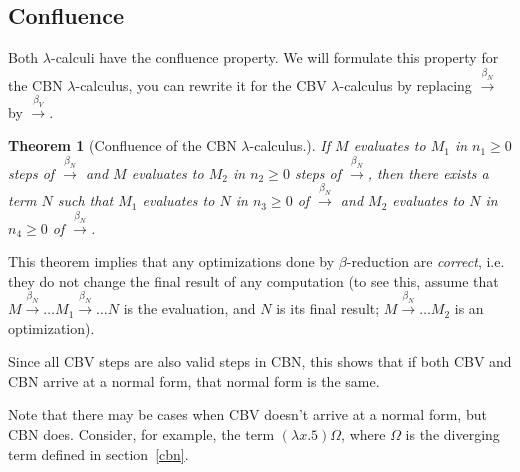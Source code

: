 \documentclass{article}
\newcommand{\lam}{\lambda}
\newcommand{\cbnb}{\overset{\beta_{N}}{\rightarrow}}
\newcommand{\cbvb}{\overset{\beta_{V}}{\rightarrow}}
\newtheorem*{theorem}{Theorem}
\begin{document}
\subsection{Confluence}\label{confluence}
Both $\lam$-calculi have the confluence property. We will formulate this property for the CBN $\lam$-calculus, you can rewrite it for the CBV $\lam$-calculus by replacing $\cbnb$ by $\cbvb$.

\begin{theorem}[Confluence of the CBN $\lam$-calculus.]
If $M$ evaluates to $M_1$ in $n_1 \geq 0$ steps of $\cbnb$ and $M$ evaluates to $M_2$ in $n_2 \geq 0$ steps of $\cbnb$, then 
there exists a term $N$ such that $M_1$ evaluates to $N$ in $n_3 \geq 0$ of $\cbnb$ and $M_2$ evaluates to $N$ in $n_4 \geq 0$ of $\cbnb$.
\end{theorem}

This theorem implies that any optimizations done by $\beta$-reduction are \textit{correct}, i.e. they do not change the final result of any computation (to see this, assume that $M \cbnb \dots M_1 \cbnb \dots N$ is the evaluation, and $N$ is its final result; $M \cbnb \dots M_2$ is an optimization).

Since all CBV steps are also valid steps in CBN, this shows that if both CBV and CBN arrive at a normal form, that normal form is the same.  

Note that there may be cases when CBV doesn't arrive at a normal form, but CBN does. Consider, for example, the term $(\lam x. 5)\Omega$, where $\Omega$ is the diverging term defined in section~\ref{cbn}. 
\end{document}

